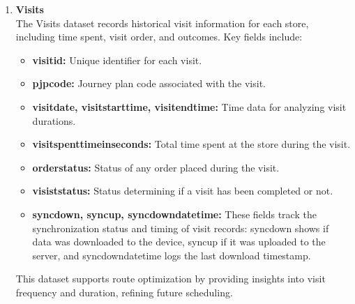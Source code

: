 \begin{enumerate}
\item \textbf{Visits} \\
The Visits dataset records historical visit information for each store, including time spent, visit order, and outcomes. Key fields include:
    \begin{itemize}
        \item \textbf{visitid:} Unique identifier for each visit.
        \item \textbf{pjpcode:} Journey plan code associated with the visit.
        \item \textbf{visitdate, visitstarttime, visitendtime:} Time data for analyzing visit durations.
        \item \textbf{visitspenttimeinseconds:} Total time spent at the store during the visit.
        \item \textbf{orderstatus:} Status of any order placed during the visit.
        \item \textbf{visiststatus: } Status determining if a visit has been completed or not.
        \item \textbf{syncdown, syncup, syncdowndatetime: } These fields track the synchronization status and timing of visit records: syncdown shows if data was downloaded to the device, syncup if it was uploaded to the server, and syncdowndatetime logs the last download timestamp.
    \end{itemize}
This dataset supports route optimization by providing insights into visit frequency and duration, refining future scheduling.

\end{enumerate}






